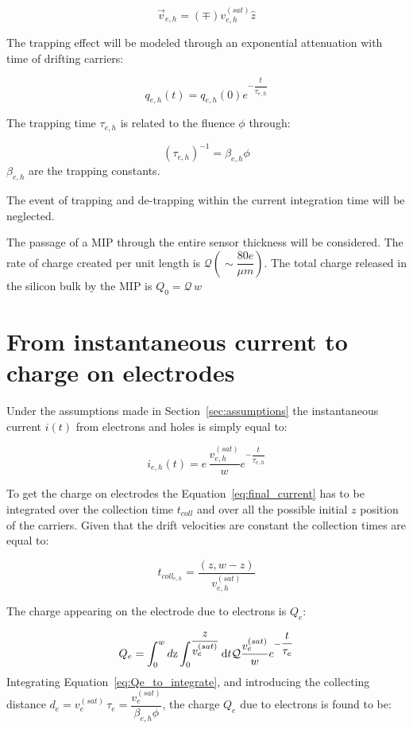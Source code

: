 \begin{equation}
\vec{v}_{e,h}=(\mp)v^{(sat)}_{e,h}\hat{z}
\end{equation}

The trapping effect will be modeled through an exponential attenuation with time of drifting carriers:

\begin{equation}
q_{e,h}(t) = q_{e,h}(0)e^{-\dfrac{t}{\tau_{e,h}}}
\end{equation}

The trapping time $\tau_{e,h}$ is related to the fluence $\phi$ through:

\begin{equation}
(\tau_{e,h})^{-1}=\beta_{e,h}\phi
\end{equation}
$\beta_{e,h}$ are the trapping constants.

The event of trapping and de-trapping within the current integration time will be neglected.

The passage of a MIP through the entire sensor thickness will be considered. The 
rate of charge created per unit length is $\mathcal{Q} (\sim \dfrac{80e}{\mu m})$. The total charge 
released in the silicon bulk by the MIP is $Q_0=\mathcal{Q}\,w$

\section{From instantaneous current to charge on electrodes}
\label{sec:charge}
Under the assumptions made in Section~\ref{sec:assumptions} the instantaneous current $i(t)$ 
from electrons and holes is simply equal to:

\begin{equation}
i_{e,h}(t)=e\,\dfrac{v^{(sat)}_{e,h}}{w}e^{-\dfrac{t}{\tau_{e,h}}}
\label{eq:final_current}
\end{equation}

To get the charge on electrodes the Equation~\ref{eq:final_current} has to be integrated over the collection time $t_{coll}$ and over all the possible initial $z$ position of the carriers.
Given that the drift velocities are constant the collection times are equal to:

\begin{equation}
t_{coll_{e,h}}=\dfrac{(z,w-z)}{v^{(sat)}_{e,h}}
\end{equation}

The charge appearing on the electrode due to electrons  is $Q_e$:

\begin{equation}
Q_e = \int_0^wd{\rm z}\int_0^{\dfrac{z}{v^{(sat)}_{e}}}{\rm d}t\mathcal{Q}\dfrac{v^{(sat)}_{e}}{w}e^{-\dfrac{t}{\tau_{e}}}
\label{eq:Qe_to_integrate}
\end{equation}
Integrating Equation~\ref{eq:Qe_to_integrate}, and introducing the collecting distance $d_e=v^{(sat)}_{e}\,\tau_{e}=\dfrac{v^{(sat)}_{e}}{\beta_{e,h}\phi}$, the charge  $Q_e$ due to electrons is found to be:

